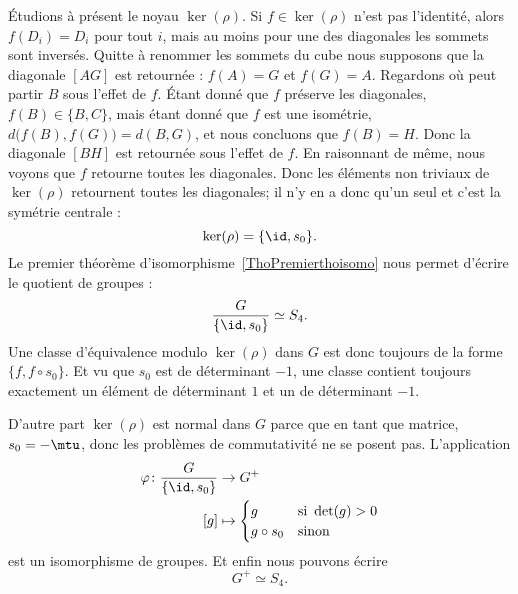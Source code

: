 Étudions à présent le noyau \( \ker(\rho)\). Si \( f\in\ker(\rho)\) n'est pas l'identité, alors \( f(D_i)=D_i\) pour tout \( i\), mais au moins pour une des diagonales les sommets sont inversés. Quitte à renommer les sommets du cube nous supposons que la diagonale \( [AG]\) est retournée : \( f(A)=G\) et \( f(G)=A\). Regardons où peut partir \( B\) sous l'effet de \( f\). Étant donné que \( f\) préserve les diagonales, \( f(B)\in\{ B,C \}\), mais étant donné que \( f\) est une isométrie, \( d\big( f(B),f(G) \big)=d(B,G)\), et nous concluons que \( f(B)=H\). Donc la diagonale \( [BH]\) est retournée sous l'effet de \( f\). En raisonnant de même, nous voyons que \( f\) retourne toutes les diagonales. Donc les éléments non triviaux de \( \ker(\rho)\) retournent toutes les diagonales; il n'y en a donc qu'un seul et c'est la symétrie centrale :
\begin{equation}
    \ker(\rho)=\{ \id,s_0 \}.
\end{equation}
Le premier théorème d'isomorphisme~\ref{ThoPremierthoisomo} nous permet d'écrire le quotient de groupes :
\begin{equation}
    \frac{ G }{ \{ \id,s_0 \} }\simeq S_4.
\end{equation}
Une classe d'équivalence modulo \( \ker(\rho)\) dans \( G\) est donc toujours de la forme \( \{ f,f\circ s_0 \}\). Et vu que \( s_0\) est de déterminant \( -1\), une classe contient toujours exactement un élément de déterminant \( 1\) et un de déterminant \( -1\).

D'autre part \( \ker(\rho)\) est normal dans \( G\) parce que en tant que matrice, \( s_0=-\mtu\), donc les problèmes de commutativité ne se posent pas. L'application
\begin{equation}
    \begin{aligned}
        \varphi\colon \frac{ G }{ \{ \id,s_0 \} }&\to G^+ \\
        [g]&\mapsto \begin{cases}
            g    &   \text{si } \det(g)>0\\
            g\circ s_0    &    \text{sinon}
        \end{cases}
    \end{aligned}
\end{equation}
est un isomorphisme de groupes. Et enfin nous pouvons écrire
\begin{equation}
    G^+\simeq S_4.
\end{equation}

